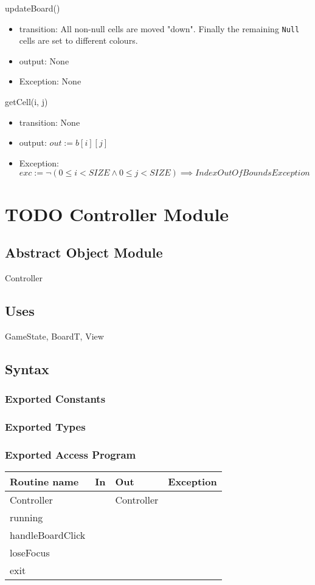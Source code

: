 \documentclass[11pt]{article}
\begin{document}
\begin{itemize}
updateBoard()
\begin{itemize}
\item transition: All non-null cells are moved "down". Finally the remaining \texttt{Null} cells are set to different colours.
\item output: None
\item Exception: None
\end{itemize}

getCell(i, j)
\begin{itemize}
\item transition: None
\item output: \(out := b[i][j]\)
\item Exception: \(exc := ¬ (0 \leq i < SIZE \land 0 \leq j < SIZE) \implies IndexOutOfBoundsException\)
\end{itemize}

\newpage
\end{itemize}
\section{{\bfseries\sffamily TODO} Controller Module}
\label{sec:orgd7db793}
\subsection*{Abstract Object Module}
\label{sec:org0119752}
Controller
\subsection*{Uses}
\label{sec:org1c908e4}
GameState, BoardT, View
\subsection*{Syntax}
\label{sec:orgbe80a32}
\subsubsection*{Exported Constants}
\label{sec:org59108ca}
\subsubsection*{Exported Types}
\label{sec:org52bfe6b}
\subsubsection*{Exported Access Program}
\label{sec:org09f2259}
\begin{center}
\begin{tabular}{l|l|l|l}
Routine name & In & Out & Exception\\
\hline
Controller &  & Controller & \\
running &  &  & \\
handleBoardClick &  &  & \\
loseFocus &  &  & \\
exit &  &  & \\
\end{tabular}
\end{center}
\end{document}
